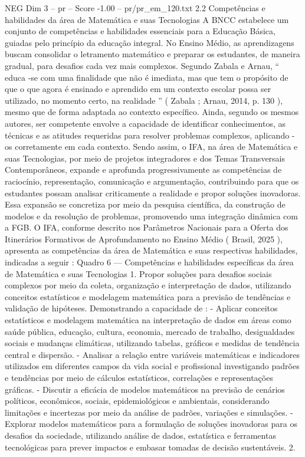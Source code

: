 \begin{textsample}{NEG Dim 3 – pr – Score -1.00 – pr/pr\_em\_120.txt}  \label{ex:f3_neg_133}
2.2 Competências e habilidades da área de Matemática e suas Tecnologias A BNCC estabelece um conjunto de competências e habilidades essenciais para a Educação Básica, guiadas pelo princípio da educação integral.
No Ensino Médio, as aprendizagens buscam consolidar o letramento matemático e preparar os estudantes, de maneira gradual, para desafios cada vez mais complexos.
Segundo Zabala e Arnau, “ educa -se com uma finalidade que não é imediata, mas que tem o propósito de que o que agora é ensinado e aprendido em um contexto escolar possa ser utilizado, no momento certo, na realidade ” ( Zabala ; Arnau, 2014, p. 130 ), mesmo que de forma adaptada ao contexto específico.
Ainda, segundo os mesmos autores, ser competente envolve a capacidade de identificar conhecimentos, as técnicas e as atitudes requeridas para resolver problemas complexos, aplicando -os corretamente em cada contexto.
Sendo assim, o IFA, na área de Matemática e suas Tecnologias, por meio de projetos integradores e dos Temas Transversais Contemporâneos, expande e aprofunda progressivamente as competências de raciocínio, representação, comunicação e argumentação, contribuindo para que os estudantes possam analisar criticamente a realidade e propor soluções inovadoras.
Essa expansão se concretiza por meio da pesquisa científica, da construção de modelos e da resolução de problemas, promovendo uma integração dinâmica com a FGB.
O IFA, conforme descrito nos Parâmetros Nacionais para a Oferta dos Itinerários Formativos de Aprofundamento no Ensino Médio ( Brasil, 2025 ), apresenta as competências da área de Matemática e suas respectivas habilidades, indicadas a seguir : Quadro 6 — Competências e habilidades específicas da área de Matemática e suas Tecnologias 1.
Propor soluções para desafios sociais complexos por meio da coleta, organização e interpretação de dados, utilizando conceitos estatísticos e modelagem matemática para a previsão de tendências e validação de hipóteses.
Demonstrando a capacidade de : - Aplicar conceitos estatísticos e modelagem matemática na interpretação de dados em áreas como saúde pública, educação, cultura, economia, mercado de trabalho, desigualdades sociais e mudanças climáticas, utilizando tabelas, gráficos e medidas de tendência central e dispersão. - Analisar a relação entre variáveis matemáticas e indicadores utilizados em diferentes campos da vida social e profissional investigando padrões e tendências por meio de cálculos estatísticos, correlações e representações gráficas. - Discutir a eficácia de modelos matemáticos na previsão de cenários políticos, econômicos, sociais, epidemiológicos e ambientais, considerando limitações e incertezas por meio da análise de padrões, variações e simulações. - Explorar modelos matemáticos para a formulação de soluções inovadoras para os desafios da sociedade, utilizando análise de dados, estatística e ferramentas tecnológicas para prever impactos e embasar tomadas de decisão sustentáveis. 2.

\end{textsample}
